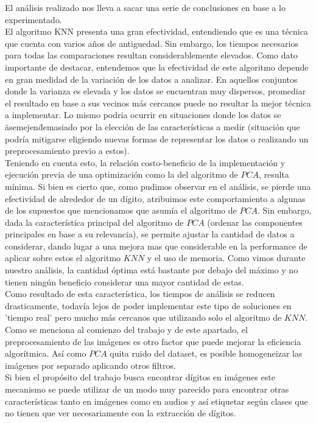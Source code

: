 El análisis realizado nos lleva a sacar una serie de conclusiones en base a lo experimentado.
\\
El algoritmo KNN presenta una gran efectividad, entendiendo que es una técnica que cuenta con varios años de antiguedad. Sin embargo, los tiempos necesarios para todas las comparaciones resultan considerablemente elevados.
Como dato importante de destacar, entendemos que la efectividad de este algoritmo depende en gran medidad de la variación de los datos a analizar. En aquellos conjuntos donde la varianza es elevada y los datos se encuentran muy dispersos, promediar el resultado en base a sus vecinos más cercanos puede no resultar la mejor técnica a implementar. Lo mismo podria ocurrir en situaciones donde los datos se \"asemejen\" demasiado por la elección de las características a medir (situación que podría mitigarse eligiendo nuevas formas de representar los datos o realizando un preprocesamiento previo a estos).
\\
Teniendo en cuenta esto, la relación costo-beneficio de la implementación y ejecución previa de una optimización como la del algoritmo de $PCA$, resulta mínima. Si bien es cierto que, como pudimos observar en el análisis, se pierde una efectividad de alrededor de un dígito, atribuimos este comportamiento a algunas de los supuestos que mencionamos que asumía el algoritmo de $PCA$.
Sin embargo, dada la característica principal del algoritmo de $PCA$ (ordenar las componentes principales en base a su relevancia), se permite ajustar la cantidad de datos a considerar, dando lugar a una mejora mas que considerable en la performance de aplicar sobre estos el algoritmo $KNN$ y el uso de memoria. Como vimos durante nuestro análisis, la cantidad óptima está bastante por debajo del máximo y no tienen ningún beneficio considerar una mayor cantidad de estas.
\\
Como resultado de esta característica, los tiempos de análisis se reducen drasticamente, todavía lejos de poder implementar este tipo de soluciones en 'tiempo real' pero mucho más cercanos que utilizando solo el algoritmo de $KNN$.
\\
Como se menciona al comienzo del trabajo y de este apartado, el preprocesamiento de las imágenes es otro factor que puede mejorar la eficiencia algorítmica. Así como $PCA$ quita ruido del dataset, es posible homogeneizar las imágenes por separado aplicando otros filtros.
\\
Si bien el propósito del trabajo busca encontrar dígitos en imágenes este mecanismo se puede utilizar de un modo muy parecido para encontrar otras características tanto en imágenes como en audios y así etiquetar según clases que no tienen que ver necesariamente con la extracción de dígitos.
